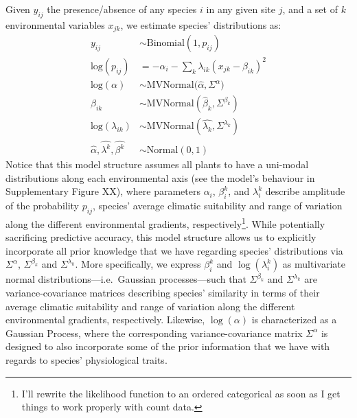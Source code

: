 \documentclass[11pt, a4paper]{article}
\begin{document}
Given $y_{ij}$ the presence/absence of any species $i$ in any given site $j$, and a set of $k$ environmental variables $x_{jk}$, we estimate species' distributions as:
\begin{equation} 
\begin{split}
y_{ij} & \sim \text{Binomial}\left(1, p_{ij}\right)\\
\text{log}\left(p_{ij}\right) & = -\alpha_{i} - \sum_{k} \lambda_{ik} \left(x_{jk}-\beta_{ik}\right)^2\\
\text{log}(\alpha)  & \sim \text{MVNormal}\Big(\hat{\alpha}, \Sigma^{\alpha}\Big)\\
\beta_{ik}  & \sim \text{MVNormal}\left(\hat{\beta}_{k}, \Sigma^{\beta_{k}}\right)\\
\text{log}(\lambda_{ik})  & \sim \text{MVNormal}\left(\hat{\lambda_{k}}, \Sigma^{\lambda_{k}}\right)\\
\hat{\alpha}, 
\hat{\lambda^{k}}, 
\hat{\beta^{k}}  & \sim \text{Normal}\left(0,1\right)
\end{split}
\label{eq:baseline}
\end{equation}
Notice that this model structure assumes all plants to have a uni-modal distributions along each environmental axis (see the model's behaviour in Supplementary Figure XX), where parameters $\alpha_i$, $\beta_i^k$, and $\lambda_i^k$ describe amplitude of the probability $p_{ij}$, species' average climatic suitability and range of variation along the different environmental gradients, respectively\footnote[2]{I'll rewrite the likelihood function to an ordered categorical as soon as I get things to work properly with count data.}. While potentially sacrificing predictive accuracy, this model structure allows us to explicitly incorporate all prior knowledge that we have regarding species' distributions via $\Sigma^{\alpha}$, $\Sigma^{\beta_{k}}$ and $\Sigma^{\lambda_{k}}$. More specifically, we express $\beta_i^k$ and $\log\left(\lambda_i^k\right)$ as multivariate normal distributions---i.e.~Gaussian processes---such that $\Sigma^{\beta_{k}}$ and $\Sigma^{\lambda_{k}}$ are variance-covariance matrices describing species' similarity in terms of their average climatic suitability and range of variation along the different environmental gradients, respectively. Likewise, $\log\left(\alpha\right)$ is characterized as a Gaussian Process, where the corresponding variance-covariance matrix $\Sigma^{\alpha}$ is designed to also incorporate some of the prior information that we have with regards to species' physiological traits.
\end{document}
